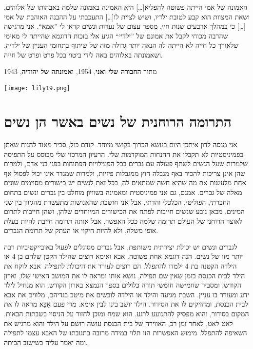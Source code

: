\documentclass[14pt, article, extrafontsizes, twopage, a4paper]{memoir}
\newcommand{\attr}[1]{
  {\raggedright\smaller#1


  }
}
\begin{document}
האמונה של אמי הייתה פשוטה להפליא[…] היא האמינה באמונה שלמה באבהותו של אלוהים, ושאת המצוות הוא קבע לטובת ילדיו, ושיש לציית לו[…] התעכבתי על ההבנה האוהבת של אמי […] כי במהלך ארבעים שנות חיי, מספר עצום של נערות ונשים קראו לי ”אמא“. אני מרגישה שהרבה מכוחי לקבל את אמונם של ”ילדיי“ הגיע אלי בזכות הדוגמא שהייתה לי מאימי שלאורך כל חייה לא הייתה לה הנאה יותר גדולה מזה של שיתוף בתחומי העניין של ילדיה, ושאמונתה באלוהים באה לידי ביטוי בכל פרט ופרט של חייה.

\attr{מתוך \textbf{החבורה שלי ואני}, 1954, ו\textbf{אמונתה של יהודיה}, 1943}

{
  \centering
\vspace*{.5\baselineskip}
\texttt{[image: lily19.png]}\\

}

\chapter{התרומה הרוחנית של נשים באשר הן נשים}

אני מנסה לדון איתכן היום בנושא הכרוך בקושי מיוחד. קודם כול,
סביר מאוד להניח שאתן כפמיניסטיות לא תקבלו
את ההנחות המוקדמות שלי. הרעיון המרכזי שלי מבוסס על התפיסה
שלמרות שעל הנשים לשתף פעולה עם גברים בכל
הפעילויות הפתוחות בפני בני אדם, ולמרות שהן אינן צריכות
להכיר באף מגבלה חוץ ממגבלות פיזיות, ולמרות שמגדר
אינו יכול לפסול אף אחת מלעשות את מה שהיא חשה שמתאים לה, בכל זאת לנשים יש כישורים מסוימים
שונים מאלה של גברים. אמנם,
גם אני פמיניסטית ומאמינה בשוויון מוחלט בין
גברים ונשים בתחום החברתי, הפוליטי, הכלכלי והדתי,
אבל אני חושבת שהאנושות מתעשרת
מהגיוון בין שני המינים. מכאן נובע שנשים חייבות
לפתח את הכישורים המיוחדים שלהן, ושהן חייבות לתרום
לאוצר הרוחני של העולם תרומה שלמה
ככל האפשר. אבל אותה תרומה חייבת להיות בעלת אופי משלה,
ולא להיות חיקוי או העתק של תרומת הגברים.

לגברים ונשים יש יכולת יצירתית משותפת, אבל
גברים מסוגלים לפעול באובייקטיביות רבה יותר מזו של נשים. הנה
דוגמא אחת פשוטה. אבא ואימא רוצים שהילד הקטן שלהם
בן 4 או הילדה הקטנה בת 4 ילמדו להתפלל. הם רוצים
לעורר את היכולת לתפילה. אבא לוקח את הילד
לבית הכנסת בזמן שאין שם תפילה, נושא
אותו ומראה לו את המושב האישי שלו,
וארון הקודש, ומסביר שחמישה חומשי תורה
כלולים בספר הנמצא בארון הקודש.
הוא מנחיל לילד ידע ומעורר בו עניין. השבת
מגיעה והילד או הילדה לובשים את מיטב בגדיהם,
מלווים את אבא לבית הכנסת, ומחזיקים לו את הסידור.
הילד יושב בינו לבין אימא.
מדי פעם אַבָּא מראה לו את המקום בסידור, והוא מפסיק
להתנועע לרגע. הוא שמח ומוכן לחזור
על הניסוי בשבתות הבאות. לאט לאט, לאחר
זמן רב, האווירה של בית הכנסת עושה רושם
על הילד והוא מרגיש את השאיפה להתפלל.
מימוש האפשרות הזו תלוי במידה מרובה
בתגובתו של האבא עצמו לתפילה
ומה יאמר עליה כשישוב הביתה.
\end{document}
